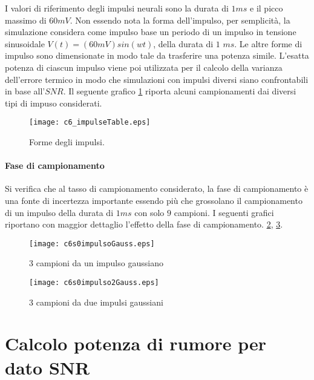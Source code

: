 I valori di riferimento degli impulsi neurali sono la durata di $1ms$ e il picco massimo di $60mV$. Non essendo nota la forma dell'impulso,  per semplicità, la simulazione considera come impulso base un periodo di un impulso in tensione sinusoidale
$ V(t) = (60mV) sin( wt) $, della durata di $1$ $ms$. Le altre forme di impulso sono dimensionate in modo tale da trasferire una potenza simile. L'esatta potenza di ciascun impulso viene poi utilizzata per il calcolo della varianza dell'errore termico in modo che simulazioni con impulsi diversi siano confrontabili in base all'$SNR$. Il seguente grafico \ref{fig:c6_impulseTable} riporta alcuni campionamenti dai diversi tipi di impuso considerati.

\begin{figure}%
\centering    
\texttt{[image: c6\_impulseTable.eps]}
\caption[Forme degli impulsi]
{Forme degli impulsi.}
\label{fig:c6_impulseTable}
\end{figure}

\paragraph{Fase di campionamento}
Si verifica che al tasso di campionamento considerato, la fase di campionamento è una fonte di incertezza importante essendo più che grossolano il campionamento di un impulso della durata di $1ms$ con solo $9$ campioni. I seguenti grafici riportano con maggior dettaglio l'effetto della fase di campionamento.
\ref{fig:c6s0impulsoGauss}, \ref{fig:c6s0impulso2Gauss}.


\begin{figure}[tbp] 
\centering    
\texttt{[image: c6s0impulsoGauss.eps]}
\caption[Campionamento di un impulso gaussiano]
{3 campioni da un impulso gaussiano}
\label{fig:c6s0impulsoGauss}
\end{figure}


\begin{figure}[tbp] 
\centering    
\texttt{[image: c6s0impulso2Gauss.eps]}
\caption[Campionamento di due impulsi gaussiani]
{3 campioni da due impulsi gaussiani}
\label{fig:c6s0impulso2Gauss}
\end{figure}






\section{Calcolo potenza di rumore per dato SNR}
\label{sez:calcoloSNR}

